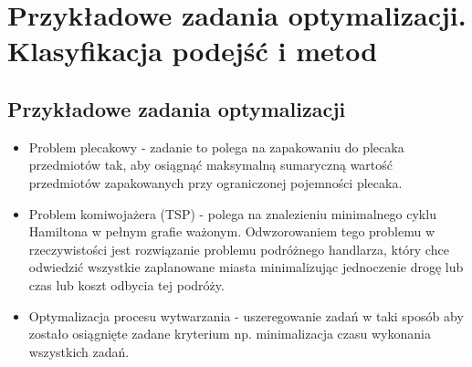 \section{Przykładowe zadania optymalizacji. Klasyfikacja podejść i metod}
	\subsection{Przykładowe zadania optymalizacji}
	\begin{itemize}
		\item Problem plecakowy - zadanie to polega na zapakowaniu do plecaka przedmiotów
		 tak, aby osiągnąć maksymalną sumaryczną wartość przedmiotów zapakowanych
		 przy ograniczonej pojemności plecaka.
		 \item Problem komiwojażera (TSP) - polega na znalezieniu minimalnego cyklu Hamiltona
		 w pełnym grafie ważonym. Odwzorowaniem tego problemu w rzeczywistości jest 
		 rozwiązanie problemu podróżnego handlarza, który chce odwiedzić wszystkie
		 zaplanowane miasta minimalizując jednoczenie drogę lub czas lub koszt odbycia tej
		 podróży.
		 \item Optymalizacja procesu wytwarzania - uszeregowanie zadań w taki sposób aby
		 zostało osiągnięte zadane kryterium np. minimalizacja czasu wykonania wszystkich
		 zadań.
	\end{itemize}
